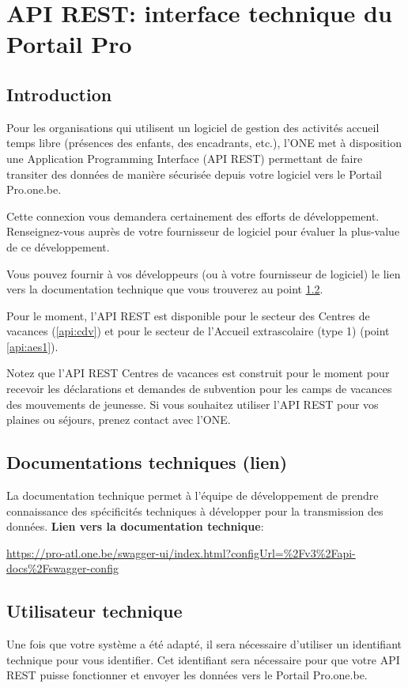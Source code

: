 \chapter{API REST: interface technique du Portail Pro}

\section{Introduction}
Pour les organisations qui utilisent un logiciel de gestion des activités accueil temps libre (présences des enfants, des encadrants, etc.), l'ONE met à disposition une Application Programming Interface (API REST) permettant de faire transiter des données de manière sécurisée depuis votre logiciel vers le Portail Pro.one.be. 

Cette connexion vous demandera certainement des efforts de développement. Renseignez-vous auprès de votre fournisseur de logiciel pour évaluer la plus-value de ce développement.

Vous pouvez fournir à vos développeurs (ou à votre fournisseur de logiciel) le lien vers la documentation technique que vous trouverez au point \ref{api_doc}.

Pour le moment, l'API REST est disponible pour le secteur des Centres de vacances (\ref{api:cdv}) et pour le secteur de l'Accueil extrascolaire (type 1) (point \ref{api:aes1}). 


Notez que l'API REST Centres de vacances est construit pour le moment pour recevoir les déclarations et demandes de subvention pour les camps de vacances des mouvements de jeunesse. Si vous souhaitez utiliser l'API REST pour vos plaines ou séjours, prenez contact avec l'ONE.




\section{Documentations techniques (lien)}\label{api_doc}
La documentation technique permet à l'équipe de développement de prendre connaissance des spécificités techniques à développer pour la transmission des données. \textbf{Lien vers la documentation technique}: 

\url{https://pro-atl.one.be/swagger-ui/index.html?configUrl=\%2Fv3\%2Fapi-docs\%2Fswagger-config}



\section{Utilisateur technique}\label{api:user}
Une fois que votre système a été adapté, il sera nécessaire d'utiliser un identifiant technique pour vous identifier. Cet identifiant sera nécessaire pour que votre API REST puisse fonctionner et envoyer les données vers le Portail Pro.one.be.

